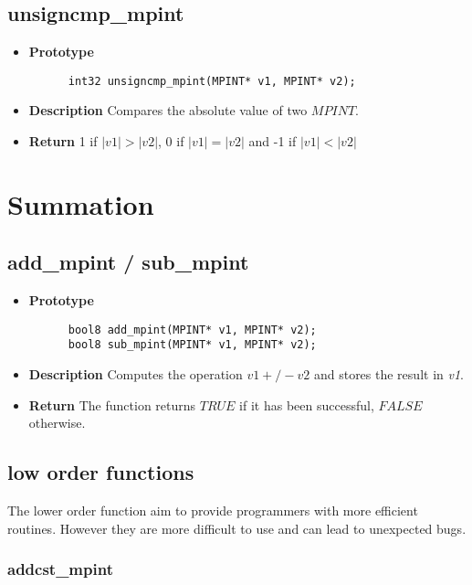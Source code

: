\documentclass[10pt,a4paper]{article}
\begin{document}
  \subsection{unsigncmp\_mpint}
  
  \begin{itemize}
    \item [] \textbf{Prototype}
    \begin{lstlisting}
      int32 unsigncmp_mpint(MPINT* v1, MPINT* v2);
    \end{lstlisting}
    \item [] \textbf{Description} Compares the absolute value of two $MPINT$.
    \item [] \textbf{Return} 1 if $|v1| > |v2|$, 0 if $|v1| = |v2|$ and -1 if $|v1| < |v2|$
  \end{itemize}
  
  \section{Summation}
  
  \subsection{add\_mpint / sub\_mpint}
  
  \begin{itemize}
    \item [] \textbf{Prototype}
    \begin{lstlisting}
      bool8 add_mpint(MPINT* v1, MPINT* v2);
      bool8 sub_mpint(MPINT* v1, MPINT* v2);
    \end{lstlisting}
    \item [] \textbf{Description} Computes the operation $v1 +/- v2$ and stores the result in \textit{v1}.
    \item [] \textbf{Return} The function returns $TRUE$ if it has been successful, $FALSE$ otherwise.
  \end{itemize}
  
  \subsection{low order functions}
  
  The lower order function aim to provide programmers with more efficient routines. However they are more difficult to use and can lead to unexpected bugs.
  
  \subsubsection{addcst\_mpint}
  
\end{document}

